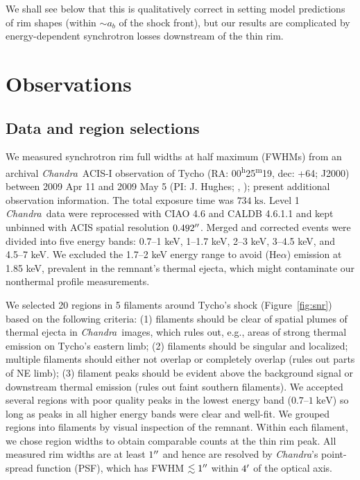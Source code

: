 \documentclass[iop, apj, numberedappendix]{emulateapj}
\newcommand*{\mt}{\mathrm}
\newcommand*{\unit}[1]{\;\mt{#1}}  %
\newcommand*{\abt}{\mathord{\sim}} %
\newcommand*{\tsup}{\textsuperscript}
\newcommand*{\Chandra}{\textit{Chandra}\ }
\begin{document}
We shall see below that this is qualitatively correct in setting model
predictions of rim shapes (within $\abt a_b$ of the shock front), but our
results are complicated by energy-dependent synchrotron losses downstream of
the thin rim.


\section{Observations}
\label{sec:observations}

\subsection{Data and region selections}
\label{sec:regions}

We measured synchrotron rim full widths at half maximum (FWHMs) from an
archival \Chandra ACIS-I observation of Tycho
(RA: 00\tsup{h}25\tsup{m}19, dec: +64; J2000)
between 2009 Apr 11 and 2009 May 5 (PI: J. Hughes;
,
); \citet{eriksen2011}
present additional observation information.
The total exposure time was $734 \unit{ks}$.
Level 1 \Chandra data were reprocessed with CIAO 4.6 and CALDB 4.6.1.1 and kept
unbinned with ACIS spatial resolution $0.492\mbox{$^{\prime\prime}$}$.
Merged and corrected events were divided into five energy bands:
0.7--1 keV, 1--1.7 keV, 2--3 keV, 3--4.5 keV, and 4.5--7 keV.
We excluded the 1.7--2 keV energy range to avoid  (He$\alpha$)
emission at 1.85 keV, prevalent in the remnant's thermal ejecta, which
might contaminate our nonthermal profile measurements.

We selected 20 regions in 5 filaments around Tycho's shock
(Figure~\ref{fig:snr}) based on the following criteria: (1) filaments should be
clear of spatial plumes of thermal ejecta in \Chandra images, which rules out,
e.g., areas of strong thermal emission on Tycho's eastern limb; (2) filaments
should be singular and localized; multiple filaments should either not
overlap or completely overlap (rules out parts of NE limb); (3) filament
peaks should be evident above the background signal or downstream thermal
emission (rules out faint southern filaments).  We accepted several
regions with poor quality peaks in the lowest energy band ($0.7$--$1
\unit{keV}$) so long as peaks in all higher energy bands were clear and
well-fit.  We grouped regions into filaments by visual inspection of the
remnant.  Within each filament, we chose region widths to obtain comparable
counts at the thin rim peak.  All measured rim widths are at least $1\mbox{$^{\prime\prime}$}$
and hence are resolved by \textit{Chandra}'s point-spread function (PSF), which
has FWHM $\lesssim 1\mbox{$^{\prime\prime}$}$ within $4\mbox{$^\prime$}$ of the optical axis.
\end{document}

